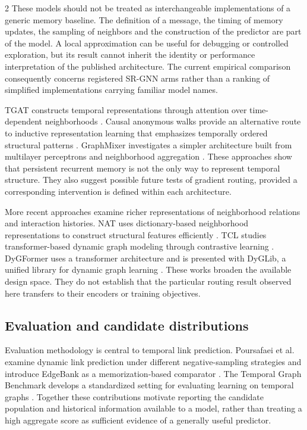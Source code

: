 \documentclass[a4paper,10pt]{article}
\begin{document}
\begin{multicols}{2}
These models should not be treated as interchangeable implementations of a generic memory baseline. The definition of a message, the timing of memory updates, the sampling of neighbors and the construction of the predictor are part of the model. A local approximation can be useful for debugging or controlled exploration, but its result cannot inherit the identity or performance interpretation of the published architecture. The current empirical comparison consequently concerns registered SR-GNN arms rather than a ranking of simplified implementations carrying familiar model names.

TGAT constructs temporal representations through attention over time-dependent neighborhoods \cite{tgat}. Causal anonymous walks provide an alternative route to inductive representation learning that emphasizes temporally ordered structural patterns \cite{cawn}. GraphMixer investigates a simpler architecture built from multilayer perceptrons and neighborhood aggregation \cite{graphmixer}. These approaches show that persistent recurrent memory is not the only way to represent temporal structure. They also suggest possible future tests of gradient routing, provided a corresponding intervention is defined within each architecture.

More recent approaches examine richer representations of neighborhood relations and interaction histories. NAT uses dictionary-based neighborhood representations to construct structural features efficiently \cite{nat}. TCL studies transformer-based dynamic graph modeling through contrastive learning \cite{tcl}. DyGFormer uses a transformer architecture and is presented with DyGLib, a unified library for dynamic graph learning \cite{dygformer}. These works broaden the available design space. They do not establish that the particular routing result observed here transfers to their encoders or training objectives.

\subsection{Evaluation and candidate distributions}
Evaluation methodology is central to temporal link prediction. Poursafaei et al. examine dynamic link prediction under different negative-sampling strategies and introduce EdgeBank as a memorization-based comparator \cite{poursafaei}. The Temporal Graph Benchmark develops a standardized setting for evaluating learning on temporal graphs \cite{tgb}. Together these contributions motivate reporting the candidate population and historical information available to a model, rather than treating a high aggregate score as sufficient evidence of a generally useful predictor.


\end{multicols}
\end{document}
